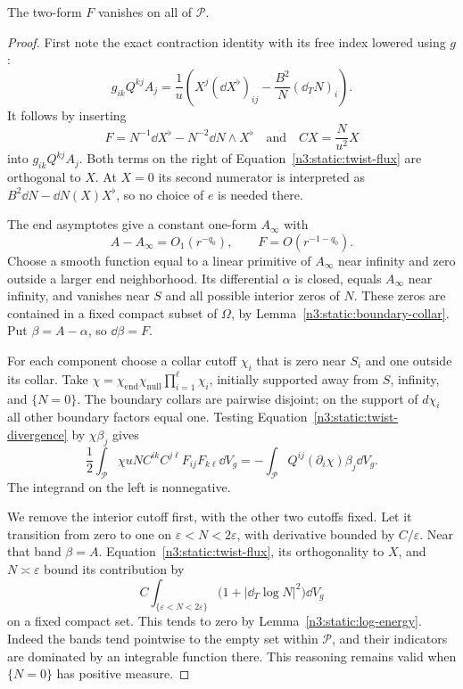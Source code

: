 \begin{lemma}
\label{n3:static:vanishing-twist}
The two-form \(F\) vanishes on all of \(\mathcal P\).
\end{lemma}

\begin{proof}
First note the exact contraction identity with its free index lowered
using \(g\):
\begin{equation}
\label{n3:static:twist-flux}
g_{ik}Q^{kj}A_j
=\frac1u\left(
X^j(\dd X^\flat)_{ij}
-\frac{B^2}{N}(\dd_TN)_i
\right).
\end{equation}
It follows by inserting
\[
F=N^{-1}\dd X^\flat-N^{-2}\dd N\wedge X^\flat
\quad\text{and}\quad CX=\frac N{u^2}X
\]
into \(g_{ik}Q^{kj}A_j\).
Both terms on the right of Equation~\eqref{n3:static:twist-flux}
are orthogonal to \(X\).
At \(X=0\) its second numerator is interpreted as
\(B^2\dd N-\dd N(X)X^\flat\), so no choice of \(e\) is needed there.

The end asymptotes give a constant one-form \(A_\infty\) with
\[
A-A_\infty=O_1(r^{-q_0}),\qquad
F=O(r^{-1-q_0}).
\]
Choose a smooth function equal to a linear primitive of \(A_\infty\)
near infinity and zero outside a larger end neighborhood.
Its differential \(\alpha\) is closed, equals \(A_\infty\) near
infinity, and vanishes near \(S\) and all possible interior zeros of
\(N\). These zeros are contained in a fixed compact subset of
\(\Omega\), by Lemma~\ref{n3:static:boundary-collar}.
Put \(\beta=A-\alpha\), so \(\dd\beta=F\).

For each component choose a collar cutoff $\chi_i$ that is zero near
$S_i$ and one outside its collar. Take
$\chi=\chi_{\mathrm{end}}\chi_{\mathrm{null}}
\prod_{i=1}^{\ell}\chi_i$, initially supported away from $S$,
infinity, and $\{N=0\}$. The boundary collars are pairwise disjoint;
on the support of $d\chi_i$ all other boundary factors equal one.
Testing
Equation~\eqref{n3:static:twist-divergence} by \(\chi\beta_j\) gives
\begin{equation}
\label{n3:static:twist-energy-cutoff}
\frac12\int_{\mathcal P}\chi uN
C^{ik}C^{j\ell}F_{ij}F_{k\ell}\dd V_g
=-\int_{\mathcal P}Q^{ij}(\partial_i\chi)\beta_j\dd V_g.
\end{equation}
The integrand on the left is nonnegative.

We remove the interior cutoff first, with the other two cutoffs fixed.
Let it transition from zero to one on
\(\varepsilon<N<2\varepsilon\), with derivative bounded by
\(C/\varepsilon\). Near that band \(\beta=A\).
Equation~\eqref{n3:static:twist-flux}, its orthogonality to \(X\),
and \(N\asymp\varepsilon\) bound its contribution by
\[
C\int_{\{\varepsilon<N<2\varepsilon\}}
\bigl(1+|\dd_T\log N|^2\bigr)\dd V_g
\]
on a fixed compact set.
This tends to zero by Lemma~\ref{n3:static:log-energy}.
Indeed the bands tend pointwise to the empty set within \(\mathcal P\),
and their indicators are dominated by an integrable function there.
This reasoning remains valid when \(\{N=0\}\) has positive measure.


\end{proof}
